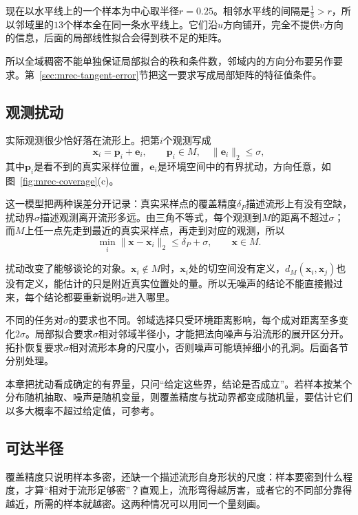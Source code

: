 现在以水平线上的一个样本为中心取半径$r=0.25$。相邻水平线的间隔是$\tfrac13>r$，所以邻域里的$13$个样本全在同一条水平线上。它们沿$u$方向铺开，完全不提供$v$方向的信息，后面的局部线性拟合会得到秩不足的矩阵。

所以全域稠密不能单独保证局部拟合的秩和条件数，邻域内的方向分布要另作要求。第~\ref{sec:mrec-tangent-error}节把这一要求写成局部矩阵的特征值条件。

\subsection{观测扰动}
\label{sec:mrec-noise}

实际观测很少恰好落在流形上。把第$i$个观测写成
\begin{equation}
 \bm x_i=\bm p_i+\bm e_i,\qquad\bm p_i\in M,\quad\lVert\bm e_i\rVert_2\leq\sigma ,
 \label{eq:mrec-noise-model}
\end{equation}
其中$\bm p_i$是看不到的真实采样位置，$\bm e_i$是环境空间中的有界扰动，方向任意，如图~\ref{fig:mrec-coverage}(c)。

这一模型把两种误差分开记录：真实采样点的覆盖精度$\delta_P$描述流形上有没有空缺，扰动界$\sigma$描述观测离开流形多远。由三角不等式，每个观测到$M$的距离不超过$\sigma$；而$M$上任一点先走到最近的真实采样点，再走到对应的观测，所以
\[
 \min_i\lVert\bm x-\bm x_i\rVert_2\leq\delta_P+\sigma,\qquad\bm x\in M.
\]

扰动改变了能够谈论的对象。$\bm x_i\notin M$时，$\bm x_i$处的切空间没有定义，$d_M(\bm x_i,\bm x_j)$也没有定义，能估计的只是附近真实位置处的量。所以无噪声的结论不能直接搬过来，每个结论都要重新说明$\sigma$进入哪里。

不同的任务对$\sigma$的要求也不同。邻域选择只受环境距离影响，每个成对距离至多变化$2\sigma$。局部拟合要求$\sigma$相对邻域半径小，才能把法向噪声与沿流形的展开区分开。拓扑恢复要求$\sigma$相对流形本身的尺度小，否则噪声可能填掉细小的孔洞。后面各节分别处理。

本章把扰动看成确定的有界量，只问“给定这些界，结论是否成立”。若样本按某个分布随机抽取、噪声是随机变量，则覆盖精度与扰动界都变成随机量，要估计它们以多大概率不超过给定值，可参考。

\subsection{可达半径}
\label{sec:mrec-reach}

覆盖精度只说明样本多密，还缺一个描述流形自身形状的尺度：样本要密到什么程度，才算“相对于流形足够密”？直观上，流形弯得越厉害，或者它的不同部分靠得越近，所需的样本就越密。这两种情况可以用同一个量刻画。


